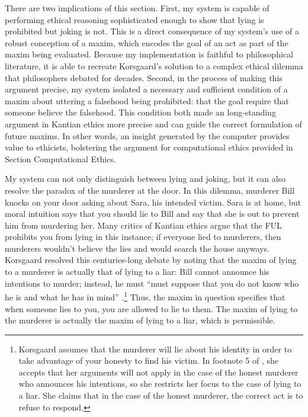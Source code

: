 \begin{isabellebody}
\begin{isamarkuptext}
There are two implications of this section. First, my system is capable of performing ethical reasoning
sophisticated enough to show that lying is prohibited but joking is not. This is a direct consequence 
of my system's use of a robust conception of a maxim, which encodes the goal of an act as part of the 
maxim being evaluated. Because my implementation is faithful to philosophical literature, it is able 
to recreate Korsgaard's solution to a complex ethical dilemma that philosophers debated for decades. Second, 
in the process of making this argument precise, my system isolated a necessary and sufficient condition 
of a maxim about uttering a falsehood being prohibited: that the goal require that someone believe
the falsehood. This condition both made an long-standing argument in Kantian ethics more precise
and can guide the correct formulation of future maxims. In other words, an insight generated by the 
computer provides value to ethicists, bolstering the argument for computational ethics provided in 
Section Computational Ethics.%
\end{isamarkuptext}\isamarkuptrue%
%
\isadelimdocument
%
\endisadelimdocument
%
\isatagdocument
%
\isamarkuptrue%
%
\endisatagdocument
{\isafolddocument}%
%
\isadelimdocument
%
\endisadelimdocument
%
\begin{isamarkuptext}%
My system can not only distinguish between lying and joking, but it can also resolve the paradox of 
the murderer at the door. In this dilemma, murderer Bill knocks on your door asking about Sara, his 
intended victim. Sara is at home, but moral intuition says that you should lie to Bill and say 
that she is out to prevent him from murdering her. Many critics of Kantian ethics argue that the 
FUL prohibits you from lying in this instance; if everyone lied to murderers, then murderers wouldn't 
believe the lies and would search the house anyways. Korsgaard resolved this centuries-long debate by 
noting that the maxim of lying to a murderer is actually that of lying to a liar: Bill cannot 
announce his intentions to murder; instead, he must ``must suppose that you do not know who he is 
and what he has in mind'' \citep{KorsgaardRTL}.\footnote{Korsgaard assumes that the murderer will 
lie about his identity in order to take advantage of your honesty to find his victim. In footnote 5 
of \citep{KorsgaardRTL}, she accepts that her arguments will not apply in the case of the honest murderer 
who announces his intentions, so she restricts her focus to the case of lying to a liar. She claims 
that in the case of the honest murderer, the correct act is to refuse to respond.} Thus, the maxim 
in question specifies that when someone lies to you, you are allowed to lie to them. The maxim of 
lying to the murderer is actually the maxim of lying to a liar, which is permissible. 


\end{isamarkuptext}
\end{isabellebody}
